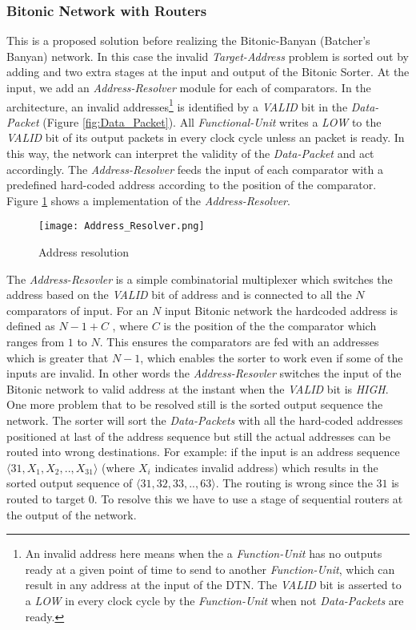 				  \subsubsection{Bitonic Network with Routers}
					      This is a proposed solution before realizing the Bitonic-Banyan \cite{batcher_banyan_ref} (Batcher's Banyan)  network. In this case the invalid \textit{Target-Address} problem is sorted
					      out by adding and two extra stages at the input and output of the Bitonic Sorter. At the input, we add an \textit{Address-Resolver} module for each of comparators. In the architecture, an invalid 
					      addresses\footnote{An invalid address here means when the a \textit{Function-Unit} has no outputs ready at a given point of time to send to another \textit{Function-Unit}, 
					      which can result in any address at the input of the DTN. The \textit{VALID} bit is asserted to a \textit{LOW} in every clock cycle by the \textit{Function-Unit} when not \textit{Data-Packets} are ready.}
					      is identified by a \textit{VALID} bit in the \textit{Data-Packet} (Figure \ref{fig:Data_Packet}). All \textit{Functional-Unit} writes a \textit{LOW} to the \textit{VALID} bit of its output packets in every clock cycle unless an packet is ready. 
					      In this way, the network can interpret the validity of the \textit{Data-Packet} and act accordingly. The \textit{Address-Resolver} feeds the input of each comparator with a predefined hard-coded address according to the position of the comparator. 
					      Figure \ref{fig:Address_Resolver} shows a implementation of the \textit{Address-Resolver}.
					      \begin{figure}[!ht]
							\texttt{[image: Address\_Resolver.png]}
						      \caption{Address resolution}
					      \label{fig:Address_Resolver}
					      \end{figure}
					      The \textit{Address-Resovler} is a simple combinatorial multiplexer which switches the address based on the \textit{VALID} bit of address and is connected to all the $N$ comparators of input.
					      For an $N$ input Bitonic network the hardcoded address is defined as $N -1 + C$ , where $C$ is the position of the the comparator which ranges from $1$ to $N$. This ensures the 
					      comparators are fed with an addresses which is greater that $N -1$, which enables the sorter to work even if some of the inputs are invalid. In other words the \textit{Address-Resovler}
					      switches the input of the Bitonic network to  valid address at the instant when the \textit{VALID} bit is \textit{HIGH}. One  more problem that to be resolved
					      still is the sorted output sequence the network. The sorter will sort the \textit{Data-Packets} with all the hard-coded addresses positioned at last of the address sequence but still the actual addresses can
					      be routed into wrong destinations. For example: if the input is an address sequence $\langle31,X_{1},X_{2},..,X_{31}\rangle$ (where $X_{i}$ indicates invalid address) which results in the sorted output sequence 
					      of $\langle31,32,33,..,63\rangle$. The routing is wrong since the $31$ is routed to target $0$. To resolve this we have to use a stage of sequential routers at the output of the network.
					      
